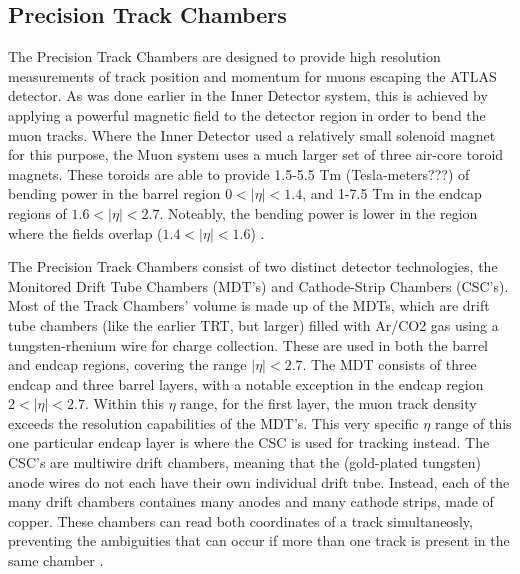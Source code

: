     \subsection{Precision Track Chambers}
        The Precision Track Chambers are designed to provide high resolution measurements of track position and momentum for muons escaping the ATLAS detector. 
        As was done earlier in the Inner Detector system, this is achieved by applying a powerful magnetic field to the detector region in order to bend the muon tracks.
        Where the Inner Detector used a relatively small solenoid magnet for this purpose, the Muon system uses a much larger set of three air-core toroid magnets.
        These toroids are able to provide 1.5-5.5 Tm (Tesla-meters???) of bending power in the barrel region $0<|\eta|<1.4$, and 1-7.5 Tm in the endcap regions of $1.6<|\eta|<2.7$.
        Noteably, the bending power is lower in the region where the fields overlap ($1.4<|\eta|<1.6$) \cite{atlas_tdr}.

        The Precision Track Chambers consist of two distinct detector technologies, the Monitored Drift Tube Chambers (MDT's) and Cathode-Strip Chambers (CSC's).
        Most of the Track Chambers' volume is made up of the MDTs, which are drift tube chambers (like the earlier TRT, but larger) filled with Ar/CO2 gas using a tungsten-rhenium wire for charge collection.
        These are used in both the barrel and endcap regions, covering the range $|\eta| < 2.7$.
        The MDT consists of three endcap and three barrel layers, with a notable exception in the endcap region $2 < |\eta| < 2.7$.
        Within this $\eta$ range, for the first layer, the muon track density exceeds the resolution capabilities of the MDT's.
        This very specific $\eta$ range of this one particular endcap layer is where the CSC is used for tracking instead.
        The CSC's are multiwire drift chambers, meaning that the (gold-plated tungsten) anode wires do not each have their own individual drift tube.
        Instead, each of the many drift chambers containes many anodes and many cathode strips, made of copper.
        These chambers can read both coordinates of a track simultaneosly, preventing the ambiguities that can occur if more than one track is present in the same chamber \cite{atlas_tdr}.

